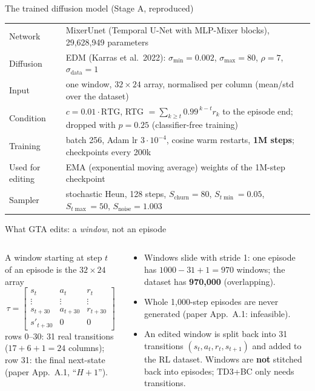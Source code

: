 \documentclass[aspectratio=169,11pt]{beamer}
\begin{document}
\begin{frame}{The trained diffusion model (Stage A, reproduced)}
\begin{tabularx}{\linewidth}{lY}
\toprule
Network & MixerUnet (Temporal U-Net with MLP-Mixer blocks), 29{,}628{,}949 parameters\\
Diffusion & EDM (Karras et al.\ 2022): $\sigma_{\min}=0.002$, $\sigma_{\max}=80$, $\rho=7$, $\sigma_{\text{data}}=1$\\
Input & one window, $32\times24$ array, normalised per column (mean/std over the dataset)\\
Condition & $c=0.01\cdot\text{RTG}$, RTG $=\sum_{k\ge t}0.99^{\,k-t}r_k$ to the episode end; dropped with $p=0.25$ (classifier-free training)\\
Training & batch 256, Adam lr $3\cdot10^{-4}$, cosine warm restarts, \textbf{1M steps}; checkpoints every 200k\\
Used for editing & EMA (exponential moving average) weights of the 1M-step checkpoint\\
Sampler & stochastic Heun, 128 steps, $S_{\text{churn}}=80$, $S_{t\min}=0.05$, $S_{t\max}=50$, $S_{\text{noise}}=1.003$\\
\bottomrule
\end{tabularx}
\end{frame}

\begin{frame}{What GTA edits: a \emph{window}, not an episode}
\begin{columns}[T]
\begin{column}{0.52\linewidth}
A window starting at step $t$ of an episode is the $32\times24$ array
\[
\tau=\begin{bmatrix}
s_t & a_t & r_t\\
\vdots & \vdots & \vdots\\
s_{t+30} & a_{t+30} & r_{t+30}\\
s'_{t+30} & 0 & 0
\end{bmatrix}
\]
rows $0$--$30$: 31 real transitions ($17+6+1=24$ columns); row 31: the final next-state (paper App.~A.1, ``$H+1$'').
\end{column}
\begin{column}{0.46\linewidth}
\begin{itemize}
\item Windows slide with stride 1: one episode has $1000-31+1=970$ windows; the dataset has \textbf{970{,}000} (overlapping).
\item Whole 1{,}000-step episodes are never generated (paper App.~A.1: infeasible).
\item An edited window is split back into 31 transitions $(s_t,a_t,r_t,s_{t+1})$ and added to the RL dataset. Windows are \textbf{not} stitched back into episodes; TD3+BC only needs transitions.
\end{itemize}
\end{column}
\end{columns}
\end{frame}
\end{document}
